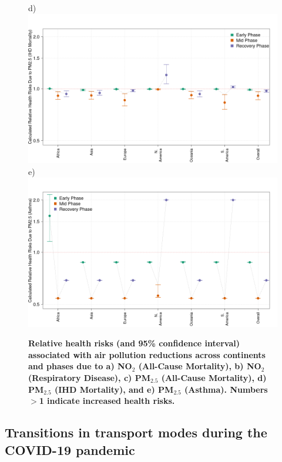 \documentclass[preprint,10pt]{elsarticle} %
\begin{document}
\begin{figure}
\scriptsize{d)}\includegraphics[trim={0 0 25 23},clip,scale=0.23]{Images/pm25ihdrisks.png}
\\
\scriptsize{e)}\includegraphics[trim={0 0 25 23},clip,scale=0.23]{Images/pm25asthmarisks.png}
\caption{\bf Relative health risks (and 95\% confidence interval) associated with air pollution reductions across continents and phases due to a) NO$_{2}$ (All-Cause Mortality), b) NO$_{2}$ (Respiratory Disease), c) PM$_{2.5}$ (All-Cause Mortality), d) PM$_{2.5}$ (IHD Mortality), and e) PM$_{2.5}$ (Asthma). Numbers $>$1 indicate increased health risks.}
 \label{fig:risks}
\end{figure}



\subsection*{Transitions in transport modes during the COVID-19 pandemic}
\end{document}
